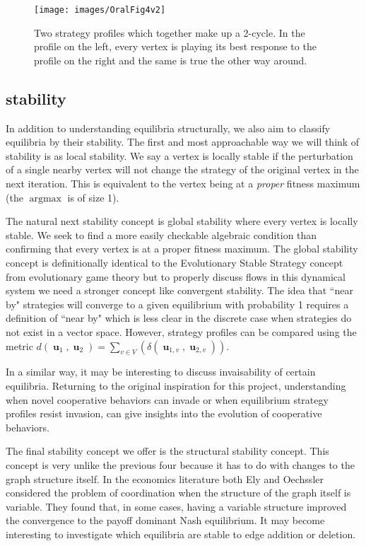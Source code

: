 \documentclass[]{article}
\DeclareMathOperator*{\argmax}{\text{argmax}}
\DeclareMathOperator{\uu}{\mathbf{u}}
\begin{document}
		\begin{figure}
			\texttt{[image: images/OralFig4v2]}
			\caption{Two strategy profiles which together make up a 2-cycle. In the profile on the left, every vertex is playing its best response to the profile on the right and the same is true the other way around.}
			\label{cycle} 
		\end{figure}
		\subsection{stability}\label{stability}
		In addition to understanding equilibria structurally, we also aim to classify equilibria by their stability. The first and most approachable way we will think of stability is as local stability. We say a vertex is locally stable if the perturbation of a single nearby vertex will not change the strategy of the original vertex in the next iteration. This is equivalent to the vertex being at a \textit{proper} fitness maximum (the $\argmax$ is of size 1). 
		
		The natural next stability concept is global stability where every vertex is locally stable. We seek to find a more easily checkable algebraic condition than confirming that every vertex is at a proper fitness maximum. The global stability concept is definitionally identical to the Evolutionary Stable Strategy concept from evolutionary game theory\cite{Apaloo2009,Nowak2006} but to properly discuss flows in this dynamical system we need a stronger concept like convergent stability. The idea that ``near by" strategies will converge to a given equilibrium with probability 1 requires a definition of ``near by" which is less clear in the discrete case when strategies do not exist in a vector space. However, strategy profiles can be compared using the metric $d(\uu_1,\uu_2)=\sum_{v\in V}(\delta(\uu_{1,v},\uu_{2,v}))$.
		
		In a similar way, it may be interesting to discuss invaisability of certain equilibria. Returning to the original inspiration for this project, understanding when novel cooperative behaviors can invade or when equilibrium strategy profiles resist invasion, can give insights into the evolution of cooperative behaviors.
		
		The final stability concept we offer is the structural stability concept. This concept is very unlike the previous four because it has to do with changes to the graph structure itself. In the economics literature both Ely and Oechssler considered the problem of coordination when the structure of the graph itself is variable. They found that, in some cases, having a variable structure improved the convergence to the payoff dominant Nash equilibrium\cite{Ely2002,Oechssler1999,Oechssler1997}. %
		It may become interesting to investigate which equilibria are stable to edge addition or deletion. 
		
\end{document}
